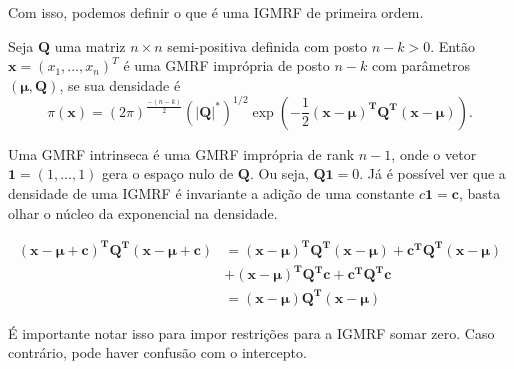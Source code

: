 Com isso, podemos definir o que é uma IGMRF de primeira ordem.

\begin{definition}
Seja $\mathbf{Q}$ uma matriz $n \times n$ semi-positiva definida com posto $n - k > 0$. Então $\mathbf{x} = (x_1, \dots, x_n)^T$ é uma GMRF imprópria de posto $n-k$ com parâmetros $(\mathbf{\mu}, \mathbf{Q})$, se sua densidade é
\begin{equation}
    \pi(\mathbf{x}) = (2\pi)^{\frac{-(n-k)}{2}}(|\mathbf{Q}|^* )^{1/2} \exp \left(  -\frac{1}{2} \mathbf{(x-\mu)^TQ^T(x-\mu)} \right).
\end{equation}
\end{definition}


Uma GMRF intrinseca é uma GMRF imprópria de rank $n-1$, onde o vetor $\mathbf{1} = (1, \dots, 1)$ gera o espaço nulo de $\mathbf{Q}$. Ou seja, $\mathbf{Q1} = 0$. Já é possível ver que a densidade de uma IGMRF é invariante a adição de uma constante $c\mathbf{1 = c}$, basta olhar o núcleo da exponencial na densidade.



\begin{equation*}
\begin{split}
        \mathbf{(x-\mu +c)^TQ^T(x-\mu+c)} &= \mathbf{(x-\mu)^TQ^T(x-\mu) + c^TQ^T(x-\mu)} \\
                                         &+   \mathbf{(x-\mu)^TQ^Tc + c^TQ^Tc} \\
                                        &= \mathbf{(x-\mu)Q^T(x-\mu)} 
\end{split}
\end{equation*}

É importante notar isso para impor restrições para a IGMRF somar zero. Caso contrário, pode haver confusão com o intercepto.